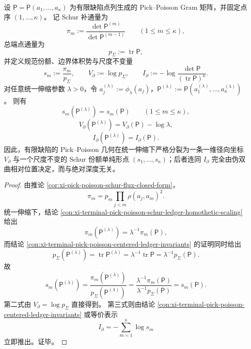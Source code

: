 \begin{theorem}\label{thm:conclusion-pick-poisson-radial-shape-separation}
设 \(\mathsf P=\mathsf P(a_1,\dots,a_\kappa)\) 为有限缺陷点列生成的 Pick--Poisson Gram 矩阵，并固定点序 \((1,\dots,\kappa)\)。
记 Schur 补通量为
\[
\pi_m:=\frac{\det \mathsf P^{(m)}}{\det \mathsf P^{(m-1)}}
\qquad(1\le m\le \kappa),
\]
总端点通量为
\[
p_\Sigma:=\operatorname{tr}\mathsf P,
\]
并定义规范份额、边界体积势与尺度不变量
\[
s_m:=\frac{\pi_m}{p_\Sigma},
\qquad
V_\partial:=\log p_\Sigma,
\qquad
I_\partial:=-\log\frac{\det\mathsf P}{(\operatorname{tr}\mathsf P)^\kappa}.
\]
对任意统一伸缩参数 \(\lambda>0\)，令 \(a_j^{(\lambda)}:=\phi_\lambda(a_j)\)，\(\mathsf P^{(\lambda)}:=\mathsf P(a_1^{(\lambda)},\dots,a_\kappa^{(\lambda)})\)。
则有
\[
s_m(\mathsf P^{(\lambda)})=s_m(\mathsf P)\qquad(1\le m\le \kappa),
\]
\[
V_\partial(\mathsf P^{(\lambda)})=V_\partial(\mathsf P)-\log\lambda,
\]
\[
I_\partial(\mathsf P^{(\lambda)})=I_\partial(\mathsf P).
\]
因此，有限缺陷的 Pick--Poisson 几何在统一伸缩下严格分裂为一条一维径向坐标 \(V_\partial\) 与一个尺度不变的 Schur 份额单纯形点 \((s_1,\dots,s_\kappa)\)；后者连同 \(I_\partial\) 完全由伪双曲相对位置决定，而与绝对深度无关。
\end{theorem}
\begin{proof}
由推论 \ref{cor:xi-pick-poisson-schur-flux-closed-form}，
\[
\pi_m=p_m\prod_{j<m}\rho(a_j,a_m)^2.
\]
统一伸缩下，结论 \ref{con:xi-terminal-pick-poisson-schur-ledger-homothetic-scaling} 给出
\[
\pi_m(\mathsf P^{(\lambda)})=\lambda^{-1}\pi_m(\mathsf P),
\]
而结论 \ref{con:xi-terminal-pick-poisson-centered-ledger-invariants} 的证明同时给出
\[
p_\Sigma(\mathsf P^{(\lambda)})=\operatorname{tr}\mathsf P^{(\lambda)}=\lambda^{-1}\operatorname{tr}\mathsf P=\lambda^{-1}p_\Sigma(\mathsf P).
\]
故
\[
s_m(\mathsf P^{(\lambda)})
=\frac{\pi_m(\mathsf P^{(\lambda)})}{p_\Sigma(\mathsf P^{(\lambda)})}
=\frac{\lambda^{-1}\pi_m(\mathsf P)}{\lambda^{-1}p_\Sigma(\mathsf P)}
=s_m(\mathsf P).
\]
第二式由 \(V_\partial=\log p_\Sigma\) 直接得到。
第三式则由结论 \ref{con:xi-terminal-pick-poisson-centered-ledger-invariants} 或等价表示
\[
I_\partial=-\sum_{m=1}^{\kappa}\log s_m
\]
立即推出。证毕。
\end{proof}

